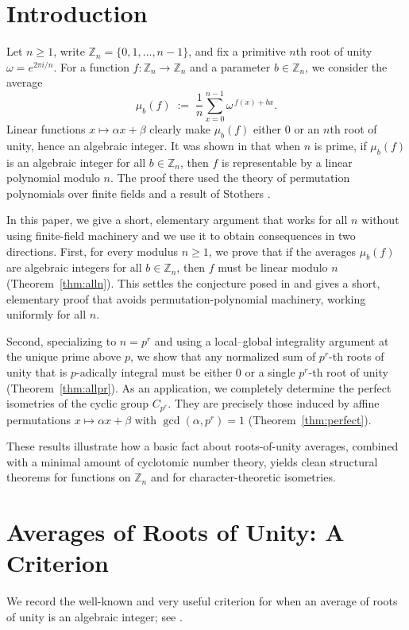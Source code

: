 \documentclass[11pt]{amsart}
\theoremstyle{definition}
\theoremstyle{remark}
\numberwithin{equation}{section}
\begin{document}
\section{Introduction}
Let $n\ge1$, write $\mathbb{Z}_n=\{0,1,\dots,n-1\}$, and fix a primitive $n$th root of unity $\omega=e^{2\pi i/n}$. For a function $f:\mathbb{Z}_n\longrightarrow\mathbb{Z}_n$ and a parameter $b\in\mathbb{Z}_n$, we consider the average
\begin{equation}\label{eq:muab}
	\mu_{b}(f)\;:=\;\frac1n\sum_{x=0}^{n-1}\omega^{\,f(x)+bx}.
\end{equation}
Linear functions $x\mapsto \alpha x+\beta$ clearly make $\mu_{b}(f)$ either $0$ or an $n$th root of unity, hence an algebraic integer. It was shown in \cite{panraksa2017note} that when $n$ is prime, if $\mu_{b}(f)$ is an algebraic integer for all $b\in\mathbb{Z}_n$, then $f$ is representable by a linear polynomial modulo $n$. The proof there used the theory of permutation polynomials over finite fields and a result of Stothers \cite{stothers1990permutation}.

In this paper, we give a short, elementary argument that works for all $n$ without using finite-field machinery and we use it to obtain consequences in two directions. First, for every modulus $n\ge1$, we prove that if the averages $\mu_b(f)$ are algebraic integers for all $b\in\mathbb Z_n$, then $f$ must be linear modulo $n$ (Theorem~\ref{thm:alln}). This settles the conjecture posed in \cite{panraksa2017note} and gives a short, elementary proof that avoids permutation-polynomial machinery, working uniformly for all $n$.

Second, specializing to $n=p^r$ and using a local--global integrality argument at the unique prime above $p$, we show that any normalized sum of $p^r$-th roots of unity that is $p$-adically integral must be either $0$ or a single $p^r$-th root of unity (Theorem~\ref{thm:allpr}). As an application, we completely determine the perfect isometries of the cyclic group $C_{p^r}$. They are precisely those induced by affine permutations $x\mapsto \alpha x+\beta$ with $\gcd(\alpha,p^r)=1$ (Theorem~\ref{thm:perfect}).

These results illustrate how a basic fact about roots-of-unity averages, combined with a minimal amount of cyclotomic number theory, yields clean structural theorems for functions on $\mathbb Z_n$ and for character-theoretic isometries.


\section{Averages of Roots of Unity: A Criterion}\label{sec:criterion}
We record the well-known and very useful criterion for when an average of roots of unity is an algebraic integer; see \cite[Lemma 4]{panraksa2017note}.
\end{document}
